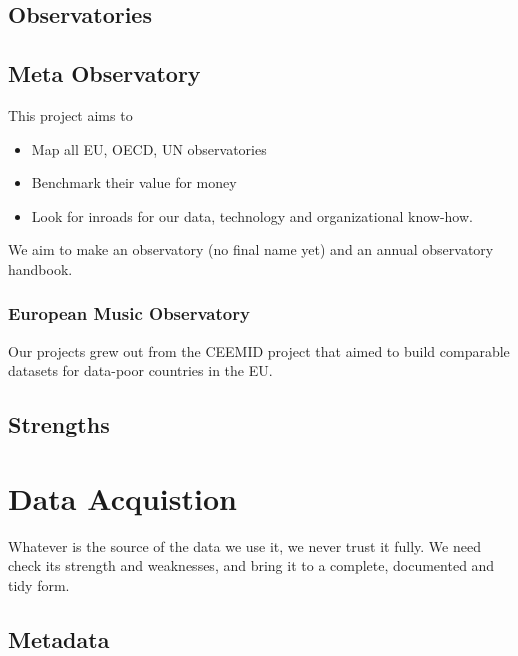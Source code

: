 \documentclass[
  fontsize=13pt,
  english,
  a4paper,
  openany, a4paper, oneside]{book}
\providecommand{\tightlist}{%
  \setlength{\itemsep}{0pt}\setlength{\parskip}{0pt}}
\begin{document}
\hypertarget{observatories}{%
\section{Observatories}\label{observatories}}

\hypertarget{meta-observatory}{%
\section{Meta Observatory}\label{meta-observatory}}

This project aims to

\begin{itemize}
\tightlist
\item
  Map all EU, OECD, UN observatories
\item
  Benchmark their value for money
\item
  Look for inroads for our data, technology and organizational know-how.
\end{itemize}

We aim to make an observatory (no final name yet) and an annual observatory handbook.

\hypertarget{emo}{%
\subsection{European Music Observatory}\label{emo}}

Our projects grew out from the CEEMID project that aimed to build comparable datasets for data-poor countries in the EU.

\hypertarget{strengths}{%
\section{Strengths}\label{strengths}}

\hypertarget{acquisition}{%
\chapter{Data Acquistion}\label{acquisition}}

Whatever is the source of the data we use it, we never trust it fully. We need check its strength and weaknesses, and bring it to a complete, documented and tidy form.

\hypertarget{collect-metadata}{%
\section{Metadata}\label{collect-metadata}}
\end{document}
